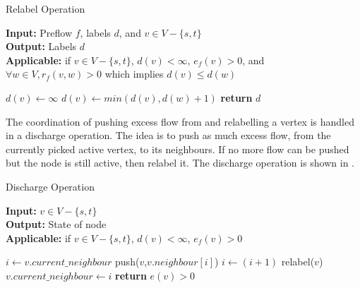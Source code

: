 \begin{algorithm}[!t]
	\caption{Relabel Operation}\label{alg:relabel}
	\textbf{Input:} Preflow $f$, labels $d$, and $v \in V-\{s,t\}$\\
	\textbf{Output:} Labels $d$\\
	\textbf{Applicable:} if $v \in V-\{s,t\}$, $d(v) < \infty$, $e_f(v)>0$, and $\forall w \in V, r_f(v,w)>0$ which implies $d(v) \leq d(w)$
	\begin{algorithmic}[1]
		\State $d(v) \gets \infty$
		\State $d(v) \gets min(d(v),d(w)+1)$
		\EndIf
		\EndFor
		\State \textbf{return} $d$
		\EndProcedure
	\end{algorithmic}
\end{algorithm}


\begin{definition}
	The coordination of pushing excess flow from and relabelling a vertex is handled in a discharge operation. The idea is to push as much excess flow, from the currently picked active vertex, to its neighbours. If no more flow can be pushed but the node is still active, then relabel it. The discharge operation is shown in .
\end{definition}

\begin{algorithm}[!t]
	\caption{Discharge Operation}\label{alg:discharge}
	\textbf{Input:} $v \in V-\{s,t\}$\\
	\textbf{Output:} State of node\\
	\textbf{Applicable:} if $v \in V-\{s,t\}$, $d(v) < \infty$, $e_f(v)>0$
	\begin{algorithmic}[1]
		\State $i \gets v.current\_neighbour$
		\State push($v$,$v.neighbour[i]$)
		\State $i \gets (i+1)$
		\EndIf
		\State relabel($v$)
		\EndIf
		\State $v.current\_neighbour \gets i$
		\State \textbf{return} $e(v)>0$ 
		\EndWhile
		\EndProcedure
	\end{algorithmic}
\end{algorithm}

